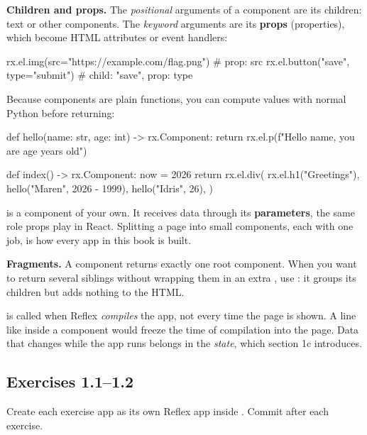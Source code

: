 \textbf{Children and props.} The \emph{positional} arguments of a component are its children: text or other components. The \emph{keyword} arguments are its \textbf{props} (properties), which become HTML attributes or event handlers:

\begin{py}
rx.el.img(src="https://example.com/flag.png")      # prop: src
rx.el.button("save", type="submit")               # child: "save", prop: type
\end{py}

Because components are plain functions, you can compute values with normal Python before returning:

\begin{py}
def hello(name: str, age: int) -> rx.Component:
	return rx.el.p(f"Hello {name}, you are {age} years old")


def index() -> rx.Component:
	now = 2026
	return rx.el.div(
		rx.el.h1("Greetings"),
		hello("Maren", 2026 - 1999),
		hello("Idris", 26),
	)
\end{py}

 is a component of your own. It receives data through its \textbf{parameters}, the same role props play in React. Splitting a page into small components, each with one job, is how every app in this book is built.

\textbf{Fragments.} A component returns exactly one root component. When you want to return several siblings without wrapping them in an extra , use : it groups its children but adds nothing to the HTML.

\begin{warn}
 is called when Reflex \emph{compiles} the app, not every time the page is shown. A line like  inside a component would freeze the time of compilation into the page. Data that changes while the app runs belongs in the \emph{state}, which section 1c introduces.
\end{warn}

\subsection{Exercises 1.1--1.2}

Create each exercise app as its own Reflex app inside . Commit after each exercise.

